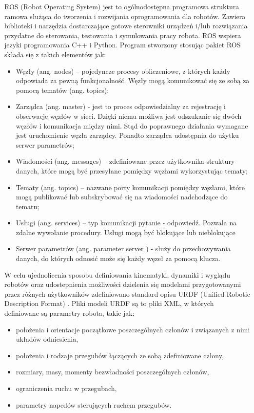 \documentclass[a4paper, 12pt, twoside]{article}
\begin{document}
ROS (Robot Operating System) \cite{rosdesc} jest to ogólnodostępna programowa struktura ramowa służąca
do tworzenia i rozwijania oprogramowania dla robotów. Zawiera biblioteki i narzędzia dostarczające gotowe sterowniki urządzeń i/lub rozwiązania przydatne do sterowania, testowania i symulowania pracy robota. ROS wspiera jezyki programowania C++ i Python. Program stworzony stosując pakiet ROS składa się z takich elementów jak:
\begin{itemize}
\item Węzły (ang. nodes) – pojedyncze procesy obliczeniowe, z których każdy odpowiada za pewną funkcjonalność. Węzły mogą komunikować się ze sobą za pomocą tematów (ang. topics);
\item Zarządca (ang. master) - jest to proces odpowiedzialny za rejestrację i obserwacje węzłów w sieci. Dzięki niemu możliwa jest odszukanie się dwóch węzłów i komunikacja między nimi. Stąd do poprawnego działania wymagane jest uruchomienie węzła zarządcy. Ponadto zarządca udostępnia do użytku serwer parametrów;
\item Wiadomości (ang. messages) – zdefiniowane przez użytkownika struktury danych, które mogą być przesyłane pomiędzy węzłami wykorzystując tematy;
\item Tematy (ang. topics) – nazwane porty komunikacji pomiędzy węzłami, które mogą publikować lub subskrybować się na wiadomości nadchodzące do tematu;
\item Usługi (ang. services) – typ komunikacji pytanie - odpowiedź. Pozwala na zdalne wywołanie procedury. Usługi mogą być blokujące lub nieblokujące
\item Serwer parametrów (ang. parameter server ) - służy do przechowywania danych, do których odnosić może się każdy węzeł za pomocą klucza.
\end{itemize}

W celu ujednolicenia sposobu definiowania kinematyki, dynamiki i wyglądu robotów oraz udostepnienia możliwości dzielenia się modelami przygotowanymi przez różnych użytkowników zdefiniowano standard opisu URDF (Unified Robotic Description Format) \cite{urdf}. Pliki modeli URDF są to pliki XML, w których definiowane są parametry robota, takie jak:
\begin{itemize}
\item położenia i orientacje początkowe poszczególnych członów i związanych z nimi układów odniesienia,
\item położenia i rodzaje przegubów łączących ze sobą zdefiniowane człony,
\item rozmiary, masy, momenty bezwładności poszczególnych członów,
\item ograniczenia ruchu w przegubach,
\item parametry napedów sterujących ruchem przegubów.
\end{itemize}
\end{document}
